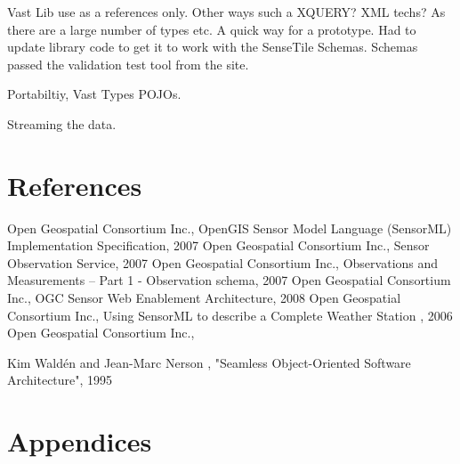 \documentclass[]{final_report}
\begin{document}
Vast Lib use as a references only. Other ways such a XQUERY? XML techs?
As there are a large number of types etc. A quick way for a prototype.
Had to update library code to get it to work with the SenseTile Schemas. Schemas
passed the validation test tool from the site.

Portabiltiy, Vast Types POJOs.

Streaming the data.

\chapter{References}
\newpage
\begin{thebibliography}{99}
Open Geospatial Consortium Inc., OpenGIS Sensor Model Language (SensorML) Implementation Specification, 2007
Open Geospatial Consortium Inc.,  Sensor Observation Service, 2007
Open Geospatial Consortium Inc., Observations and Measurements – Part 1 - Observation schema, 2007
Open Geospatial Consortium Inc., OGC Sensor Web Enablement Architecture, 2008
Open Geospatial Consortium Inc., Using SensorML to describe a
Complete Weather Station , 2006
Open Geospatial Consortium Inc.,

Kim Waldén and Jean-Marc Nerson , "Seamless Object-Oriented Software Architecture", 1995
\end{thebibliography}
\label{endpage}


\chapter{Appendices}


\end{document}
